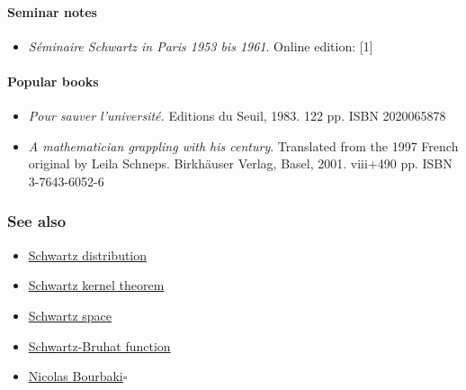 \documentclass{article}
\begin{document}
\paragraph{Seminar notes}
\begin{itemize}
	\item \textit{Séminaire Schwartz in Paris 1953 bis 1961}. Online edition: [1]
\end{itemize}

\paragraph{Popular books}
\begin{itemize}
	\item \textit{Pour sauver l'université.} Editions du Seuil, 1983. 122 pp. ISBN 2020065878
	\item \textit{A mathematician grappling with his century}. Translated from the 1997 French original by Leila Schneps. Birkhäuser Verlag, Basel, 2001. viii+490 pp. ISBN 3-7643-6052-6
\end{itemize}

\subsubsection{See also}
\begin{itemize}
	\item \href{https://en.wikipedia.org/wiki/Schwartz_distribution}{Schwartz distribution}
	\item \href{https://en.wikipedia.org/wiki/Schwartz_kernel_theorem}{Schwartz kernel theorem}
	\item \href{https://en.wikipedia.org/wiki/Schwartz_space}{Schwartz space}
	\item \href{https://en.wikipedia.org/wiki/Schwartz-Bruhat_function}{Schwartz-Bruhat function}
	\item \href{https://en.wikipedia.org/wiki/Nicolas_Bourbaki}{Nicolas Bourbaki}\hfill$\square$
\end{itemize}

\end{document}

